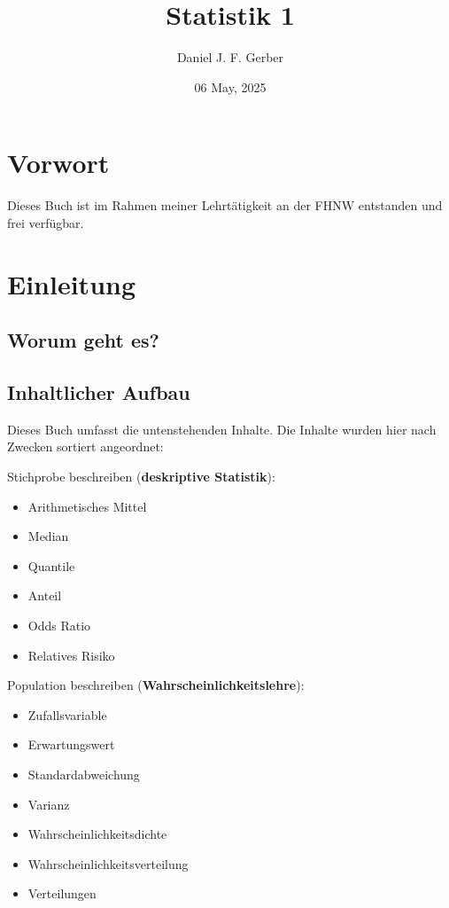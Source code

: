 \documentclass[
]{book}
\title{Statistik 1}
\author{Daniel J. F. Gerber}
\date{06 May, 2025}
\providecommand{\tightlist}{%
  \setlength{\itemsep}{0pt}\setlength{\parskip}{0pt}}
\theoremstyle{definition}
\theoremstyle{definition}
\theoremstyle{definition}
\theoremstyle{definition}
\theoremstyle{remark}
\begin{document}
\maketitle

{
\setcounter{tocdepth}{1}
\tableofcontents
}
\chapter*{Vorwort}\label{vorwort}

Dieses Buch ist im Rahmen meiner Lehrtätigkeit an der FHNW entstanden und frei verfügbar.

\chapter{Einleitung}\label{einleitung}

\section{Worum geht es?}\label{worum-geht-es}

\section{Inhaltlicher Aufbau}\label{inhaltlicher-aufbau}

Dieses Buch umfasst die untenstehenden Inhalte. Die Inhalte wurden hier nach Zwecken sortiert angeordnet:

Stichprobe beschreiben (\textbf{deskriptive Statistik}):

\begin{itemize}
\tightlist
\item
  Arithmetisches Mittel
\item
  Median
\item
  Quantile
\item
  Anteil
\item
  Odds Ratio
\item
  Relatives Risiko
\end{itemize}

Population beschreiben (\textbf{Wahrscheinlichkeitslehre}):

\begin{itemize}
\tightlist
\item
  Zufallsvariable
\item
  Erwartungswert
\item
  Standardabweichung
\item
  Varianz
\item
  Wahrscheinlichkeitsdichte
\item
  Wahrscheinlichkeitsverteilung
\item
  Verteilungen
\end{itemize}
\end{document}
